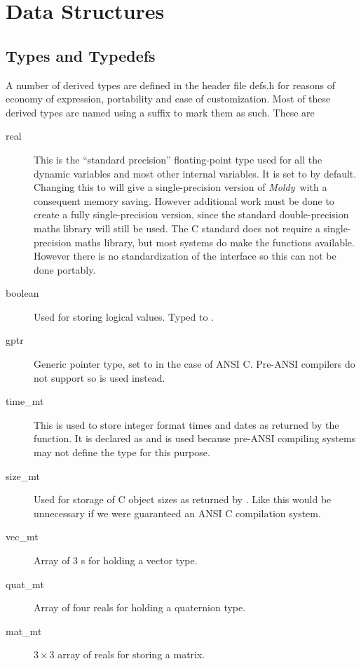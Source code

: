 \documentclass[a4paper,twoside]{report}
\newcommand{\Fname}[1]{{\upshape\mdseries\sffamily#1}}
\newenvironment{Litdescription}{\begingroup%
     \renewcommand{\descriptionlabel}[1]{\Lit{##1}}\begin{description}}%
     {\end{description}\endgroup}
\newcommand{\moldy}{\emph{Moldy}}
\begin{document}
\section{Data Structures}%
 
\subsection{Types and Typedefs}
\label{sec:types}

A number of derived types are defined in the header file
\Fname{defs.h} for reasons of economy of expression, portability and
ease of customization.  Most of these derived types are named using a
suffix  to mark them as such.  These are
\begin{Litdescription}
\item[real] This is the ``standard precision'' floating-point type
  used for all the dynamic variables and most other internal
  variables. It is set to  by default. Changing this to
   will give a single-precision version of \moldy\ with
  a consequent memory saving.  However additional work must be done to
  create a fully single-precision version, since the standard
  double-precision maths library will still be used.  The C standard
  does not require a single-precision maths library, but most systems
  do make the functions available. However there is no
  standardization of the interface so this can not be done portably.
\item[boolean] Used for storing logical values.  Typed to
  .
\item[gptr] Generic pointer type, set to  in the case of ANSI C.
  Pre-ANSI compilers do not support  so  is
  used instead.
\item[time\_mt] This is used to store integer format times and dates as
  returned by the  function.  It is declared as
   and is used because pre-ANSI compiling
  systems may not define the  type for this purpose.
\item[size\_mt] Used for storage of C object sizes as returned by
  .  Like  this would be unnecessary if
  we were guaranteed an ANSI C compilation system.
\item[vec\_mt] Array of 3 s for holding a vector type.
\item[quat\_mt] Array of four reals for holding a quaternion type.
\item[mat\_mt] $3 \times 3$ array of reals for storing a matrix.
\end{Litdescription}
\end{document}
